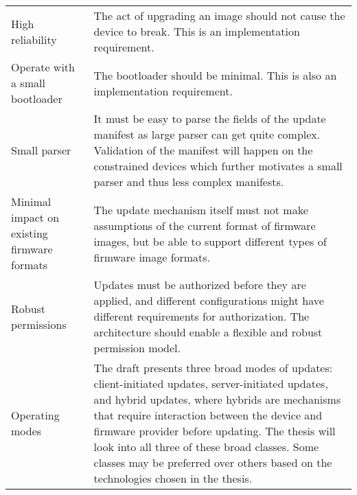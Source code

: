 \begin{longtable}[]{@{}ll@{}}
\begin{minipage}[t]{0.41\columnwidth}\raggedright\strut
High reliability\strut
\end{minipage} & \begin{minipage}[t]{0.53\columnwidth}\raggedright\strut
The act of upgrading an image should not cause the device to break. This
is an implementation requirement.\strut
\end{minipage}\tabularnewline
\begin{minipage}[t]{0.41\columnwidth}\raggedright\strut
Operate with a small bootloader\strut
\end{minipage} & \begin{minipage}[t]{0.53\columnwidth}\raggedright\strut
The bootloader should be minimal. This is also an implementation
requirement.\strut
\end{minipage}\tabularnewline
\begin{minipage}[t]{0.41\columnwidth}\raggedright\strut
Small parser\strut
\end{minipage} & \begin{minipage}[t]{0.53\columnwidth}\raggedright\strut
It must be easy to parse the fields of the update manifest as large
parser can get quite complex. Validation of the manifest will happen on
the constrained devices which further motivates a small parser and thus
less complex manifests.\strut
\end{minipage}\tabularnewline
\begin{minipage}[t]{0.41\columnwidth}\raggedright\strut
Minimal impact on existing firmware formats\strut
\end{minipage} & \begin{minipage}[t]{0.53\columnwidth}\raggedright\strut
The update mechanism itself must not make assumptions of the current
format of firmware images, but be able to support different types of
firmware image formats.\strut
\end{minipage}\tabularnewline
\begin{minipage}[t]{0.41\columnwidth}\raggedright\strut
Robust permissions\strut
\end{minipage} & \begin{minipage}[t]{0.53\columnwidth}\raggedright\strut
Updates must be authorized before they are applied, and different
configurations might have different requirements for authorization. The
architecture should enable a flexible and robust permission model.\strut
\end{minipage}\tabularnewline
\begin{minipage}[t]{0.41\columnwidth}\raggedright\strut
Operating modes\strut
\end{minipage} & \begin{minipage}[t]{0.53\columnwidth}\raggedright\strut
The draft presents three broad modes of updates: client-initiated
updates, server-initiated updates, and hybrid updates, where hybrids are
mechanisms that require interaction between the device and firmware
provider before updating. The thesis will look into all three of these
broad classes. Some classes may be preferred over others based on the
technologies chosen in the thesis.\strut
\end{minipage}\tabularnewline
\bottomrule
\end{longtable}
